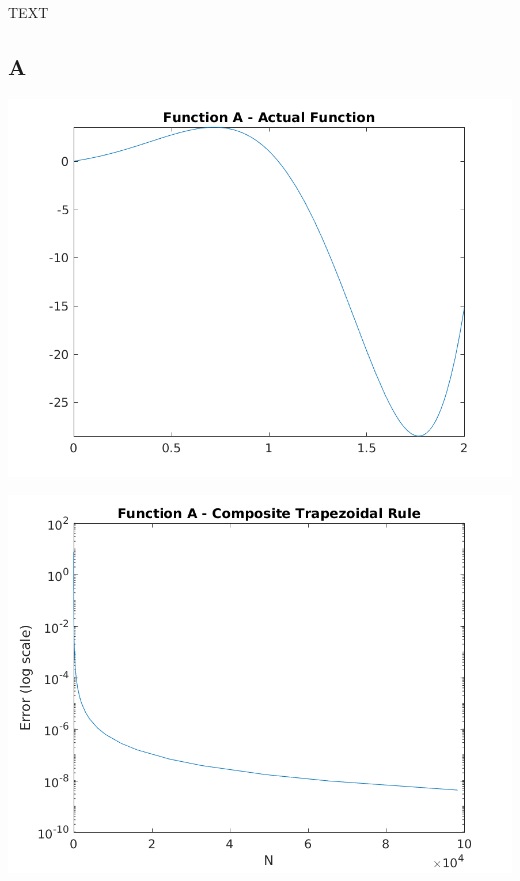 \documentclass[a4paper]{article}
\begin{document}
TEXT



\subsection{A}\label{results:a}

\begin{center}
	\includegraphics[width=1\textwidth]{../output/a_actual.png}
	\label{fig:a_act}
\end{center}

\begin{center}
	\includegraphics[width=1\textwidth]{../output/a_trapezoidal.png}
	\label{fig:a_trap}
\end{center}
\end{document}
